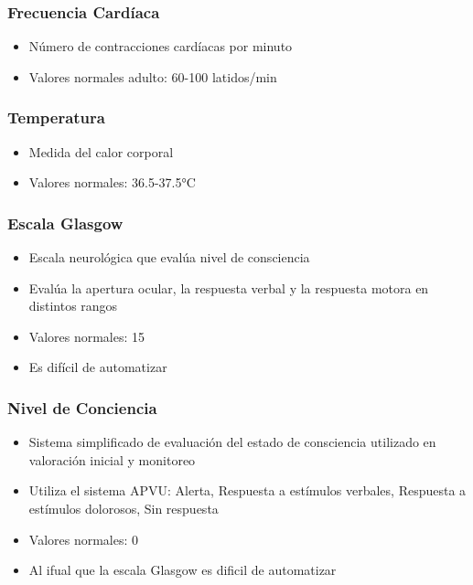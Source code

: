 \subsubsection{Frecuencia Cardíaca}
\begin{itemize}
    \item Número de contracciones cardíacas por minuto
    \item Valores normales adulto: 60-100 latidos/min
\end{itemize}

\subsubsection{Temperatura}
\begin{itemize}
    \item Medida del calor corporal
    \item Valores normales: 36.5-37.5°C
\end{itemize}

\subsubsection{Escala Glasgow}
\begin{itemize}
    \item Escala neurológica que evalúa nivel de consciencia
    \item Evalúa la apertura ocular, la respuesta verbal y la respuesta motora en distintos rangos
    \item Valores normales: 15
    \item Es difícil de automatizar
\end{itemize}

\subsubsection{Nivel de Conciencia}
\begin{itemize}
    \item Sistema simplificado de evaluación del estado de consciencia utilizado en valoración inicial y monitoreo
    \item Utiliza el sistema APVU: Alerta, Respuesta a estímulos verbales, Respuesta a estímulos dolorosos, Sin respuesta
    \item Valores normales: 0
    \item Al ifual que la escala Glasgow es dificil de automatizar
\end{itemize}

